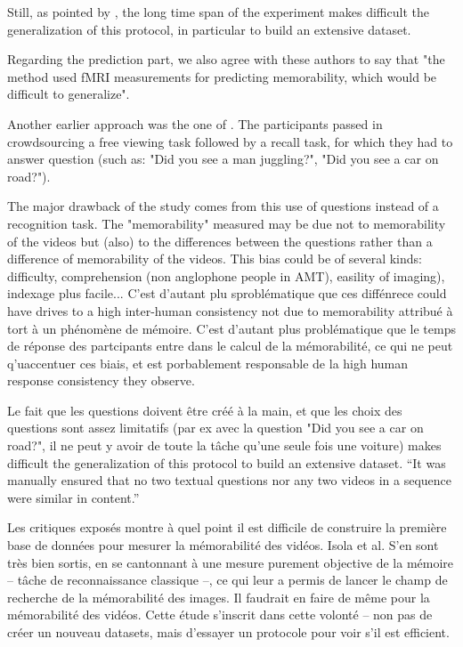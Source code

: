 \documentclass[sigconf]{acmart}
\begin{document}
Still, as pointed by \cite{shekhar_2017_show}, the long time span of the experiment makes difficult the generalization of this protocol, in particular to build an extensive dataset.

Regarding the prediction part, we also agree with these authors to say that "the method used fMRI measurements for predicting memorability, which would be difficult to generalize".


Another earlier approach was the one of \cite{shekhar_2017_show}.
The participants passed in crowdsourcing a free viewing task followed by a recall task, for which they had to answer question (such as: "Did you see a man juggling?", "Did you see a car on road?").

The major drawback of the study comes from this use of questions instead of a recognition task. The "memorability" measured may be due not to memorability of the videos but (also) to the differences between the questions rather than a difference of memorability of the videos. This bias could be of several kinds: difficulty, comprehension (non anglophone people in AMT), easility of imaging), indexage plus facile... C'est d'autant plu sproblématique que ces diffénrece could have drives to a high inter-human consistency not due to memorability attribué à tort à un phénomène de mémoire. C'est d'autant plus problématique que le temps de réponse des partcipants entre dans le calcul de la mémorabilité, ce qui ne peut q'uaccentuer ces biais, et est porbablement responsable de la high human response consistency they observe.


Le fait que les questions doivent être créé à la main, et que les choix des questions sont assez limitatifs (par ex avec la question "Did you see a car on road?", il ne peut y avoir de toute la tâche qu'une seule fois une voiture) makes difficult the generalization of this protocol to build an extensive dataset.
“It was manually ensured that no two textual questions nor any two videos in a sequence were similar in content.” 


Les critiques exposés montre à quel point il est difficile de construire la première base de données pour mesurer la mémorabilité des vidéos. Isola et al. S’en sont très bien sortis, en se cantonnant à une mesure purement objective de la mémoire – tâche de reconnaissance classique –, ce qui leur a permis de lancer le champ de recherche de la mémorabilité des images. Il faudrait en faire de même pour la mémorabilité des vidéos. Cette étude s’inscrit dans cette volonté – non pas de créer un nouveau datasets, mais d’essayer un protocole pour voir s’il est efficient.
\end{document}
